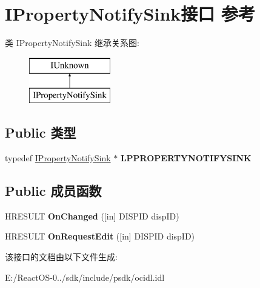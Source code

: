 \hypertarget{interface_i_property_notify_sink}{}\section{I\+Property\+Notify\+Sink接口 参考}
\label{interface_i_property_notify_sink}
类 I\+Property\+Notify\+Sink 继承关系图\+:\begin{figure}[H]
\begin{center}
\leavevmode
\includegraphics[height=2.000000cm]{interface_i_property_notify_sink}
\end{center}
\end{figure}
\subsection*{Public 类型}
\begin{DoxyCompactItemize}
\item 
\mbox{\label{interface_i_property_notify_sink_a7277037ac73c376bfe7d46d91fbf24cd}} 
typedef \hyperlink{interface_i_property_notify_sink}{I\+Property\+Notify\+Sink} $\ast$ {\bfseries L\+P\+P\+R\+O\+P\+E\+R\+T\+Y\+N\+O\+T\+I\+F\+Y\+S\+I\+NK}
\end{DoxyCompactItemize}
\subsection*{Public 成员函数}
\begin{DoxyCompactItemize}
\item 
\mbox{\label{interface_i_property_notify_sink_a26321a52ff0f6e786dabfc0d102c536a}} 
H\+R\+E\+S\+U\+LT {\bfseries On\+Changed} (\mbox{[}in\mbox{]} D\+I\+S\+P\+ID disp\+ID)
\item 
\mbox{\label{interface_i_property_notify_sink_a4ca6a669ef743ffc9ae1aedd3eb5d4c4}} 
H\+R\+E\+S\+U\+LT {\bfseries On\+Request\+Edit} (\mbox{[}in\mbox{]} D\+I\+S\+P\+ID disp\+ID)
\end{DoxyCompactItemize}


该接口的文档由以下文件生成\+:\begin{DoxyCompactItemize}
\item 
E\+:/\+React\+O\+S-\/0../sdk/include/psdk/ocidl.\+idl\end{DoxyCompactItemize}
